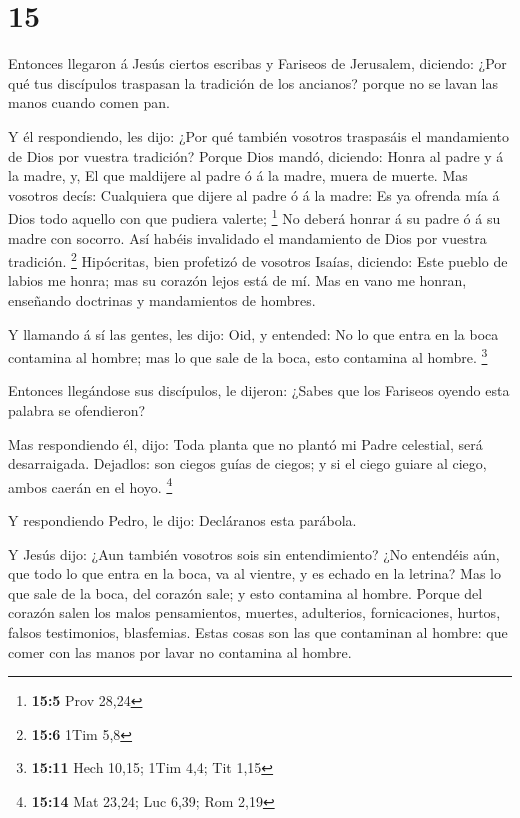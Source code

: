 \hypertarget{section-14}{%
\section{15}\label{section-14}}

 Entonces llegaron á Jesús ciertos escribas y Fariseos de
Jerusalem, diciendo:  ¿Por qué tus discípulos traspasan la
tradición de los ancianos? porque no se lavan las manos cuando comen
pan.

 Y él respondiendo, les dijo: ¿Por qué también vosotros
traspasáis el mandamiento de Dios por vuestra tradición? 
Porque Dios mandó, diciendo: Honra al padre y á la madre, y, El que
maldijere al padre ó á la madre, muera de muerte.  Mas
vosotros decís: Cualquiera que dijere al padre ó á la madre: Es ya
ofrenda mía á Dios todo aquello con que pudiera valerte; \footnote{\textbf{15:5}
  Prov 28,24}  No deberá honrar á su padre ó á su madre
con socorro. Así habéis invalidado el mandamiento de Dios por vuestra
tradición. \footnote{\textbf{15:6} 1Tim 5,8}  Hipócritas,
bien profetizó de vosotros Isaías, diciendo:  Este pueblo
de labios me honra; mas su corazón lejos está de mí.  Mas
en vano me honran, enseñando doctrinas y mandamientos de hombres.

 Y llamando á sí las gentes, les dijo: Oid, y entended:
 No lo que entra en la boca contamina al hombre; mas lo
que sale de la boca, esto contamina al hombre. \footnote{\textbf{15:11}
  Hech 10,15; 1Tim 4,4; Tit 1,15}

 Entonces llegándose sus discípulos, le dijeron: ¿Sabes
que los Fariseos oyendo esta palabra se ofendieron?

 Mas respondiendo él, dijo: Toda planta que no plantó mi
Padre celestial, será desarraigada.  Dejadlos: son ciegos
guías de ciegos; y si el ciego guiare al ciego, ambos caerán en el hoyo.
\footnote{\textbf{15:14} Mat 23,24; Luc 6,39; Rom 2,19}

 Y respondiendo Pedro, le dijo: Decláranos esta parábola.

 Y Jesús dijo: ¿Aun también vosotros sois sin
entendimiento?  ¿No entendéis aún, que todo lo que entra
en la boca, va al vientre, y es echado en la letrina? 
Mas lo que sale de la boca, del corazón sale; y esto contamina al
hombre.  Porque del corazón salen los malos pensamientos,
muertes, adulterios, fornicaciones, hurtos, falsos testimonios,
blasfemias.  Estas cosas son las que contaminan al
hombre: que comer con las manos por lavar no contamina al hombre.

